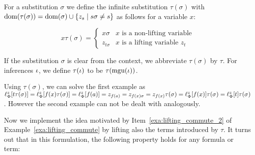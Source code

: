 \begin{defi}[$\tau$]
	For a substitution $\sigma$ we define the infinite substitution $\tau(\sigma)$ with $\operatorname{dom}(\tau(\sigma)) = \operatorname{dom}(\sigma) \cup \{z_s \mid s\sigma \neq s\}$ as follows for a variable $x$:

	\[
		x\tau(\sigma) =
		\begin{cases}
			x\sigma & \text{$x$ is a non-lifting variable} \\
			z_{t\sigma} & \text{$x$ is a lifting variable $z_t$}
		\end{cases} 
	\]

	If the substitution $\sigma$ is clear from the context, we abbreviate $\tau(\sigma)$ by $\tau$. 
	For inferences $\iota$, we define $\tau(\iota)$ to be $\tau(\operatorname{mgu}(\iota))$.
\end{defi}

\addtocounter{exa}{-2}
\begin{exa}[continued]
	Using $\tau(\sigma)$, we can solve the first example as $\ell_{\Phi}^{z}[t\tau(\sigma)] = \ell_{\Phi}^{z}[f(x)\tau(\sigma)] = \ell_{\Phi}^{z}[f(a)] = z_{f(a)} = z_{f(x)\sigma} = z_{f(x)}\tau(\sigma) = \ell_{\Phi}^{z}[f(x)]\tau(\sigma) = \ell_{\Phi}^{z}[t]\tau(\sigma)$.
	However the second example can not be dealt with analogously.
\end{exa}
\addtocounter{exa}{1}

Now we implement the idea motivated by Item~\ref{exa:lifting_commute_2} of Example~\ref{exa:lifting_commute} by lifting also the terms introduced by $\tau$.
It turns out that in this formulation, the following property holds for any formula or term:


